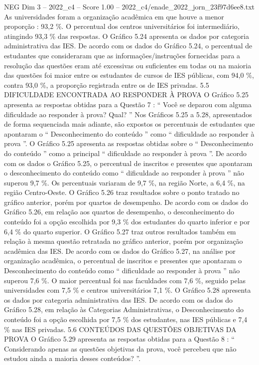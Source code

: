 \begin{textsample}{NEG Dim 3 – 2022\_c4 – Score 1.00 – 2022\_c4/enade\_2022\_jorn\_23f97d6ee8.txt}
As universidades foram a organização acadêmica em que houve a menor proporção : 93,2 \%.
O percentual dos centros universitários foi intermediário, atingindo 93,3 \% das respostas.
O Gráfico 5.24 apresenta os dados por categoria administrativa das IES.
De acordo com os dados do Gráfico 5.24, o percentual de estudantes que consideraram que as informações/instruções fornecidas para a resolução das questões eram até excessivas ou suficientes em todas ou na maioria das questões foi maior entre os estudantes de cursos de IES públicas, com 94,0 \%, contra 93,0 \%, a proporção registrada entre os de IES privadas. 5.5 DIFICULDADE ENCONTRADA AO RESPONDER À PROVA O Gráfico 5.25 apresenta as respostas obtidas para a Questão 7 : “ Você se deparou com alguma dificuldade ao responder à prova?
Qual? ” Nos Gráficos 5.25 a 5.28, apresentados de forma sequenciada mais adiante, são expostos os percentuais de estudantes que apontaram o “ Desconhecimento do conteúdo ” como “ dificuldade ao responder à prova ”.
O Gráfico 5.25 apresenta as respostas obtidas sobre o “ Desconhecimento do conteúdo ” como a principal “ dificuldade ao responder à prova ”.
De acordo com os dados o Gráfico 5.25, o percentual de inscritos e presentes que apontaram o desconhecimento do conteúdo como “ dificuldade ao responder à prova ” não superou 9,7 \%.
Os percentuais variaram de 9,7 \%, na região Norte, a 6,4 \%, na região Centro-Oeste.
O Gráfico 5.26 traz resultados sobre o ponto tratado no gráfico anterior, porém por quartos de desempenho.
De acordo com os dados do Gráfico 5.26, em relação aos quartos de desempenho, o desconhecimento do conteúdo foi a opção escolhida por 9,3 \% dos estudantes do quarto inferior e por 6,4 \% do quarto superior.
O Gráfico 5.27 traz outros resultados também em relação à mesma questão retratada no gráfico anterior, porém por organização acadêmica das IES.
De acordo com os dados do Gráfico 5.27, na análise por organização acadêmica, o percentual de inscritos e presentes que apontaram o Desconhecimento do conteúdo como “ dificuldade ao responder à prova ” não superou 7,6 \%.
O maior percentual foi nas faculdades com 7,6 \%, seguido pelas universidades com 7,5 \% e centros universitários 7,1 \%.
O Gráfico 5.28 apresenta os dados por categoria administrativa das IES.
De acordo com os dados do Gráfico 5.28, em relação às Categorias Administrativas, o Desconhecimento do conteúdo foi a opção escolhida por 7,5 \% dos estudantes, nas IES públicas e 7,4 \% nas IES privadas. 5.6 CONTEÚDOS DAS QUESTÕES OBJETIVAS DA PROVA O Gráfico 5.29 apresenta as respostas obtidas para a Questão 8 : “ Considerando apenas as questões objetivas da prova, você percebeu que não estudou ainda a maioria desses conteúdos? ”.

\end{textsample}
